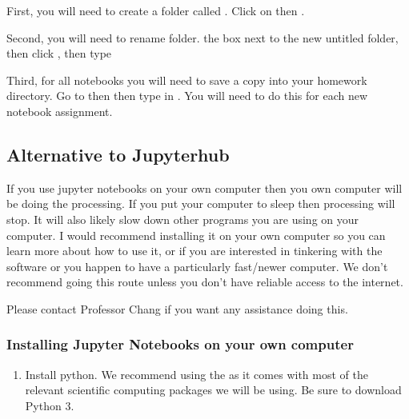 \documentclass[letterpaper,10pt,english]{sphinxmanual}
\begin{document}
First, you will need to create a folder called . Click on  then .

Second, you will need to rename folder.  the box next to the new untitled folder, then click , then type 

Third, for all notebooks you will need to save a copy into your homework directory. Go to  then  then type in . You will need to do this for each new notebook assignment.


\subsection{Alternative to Jupyterhub}
\label{\detokenize{content/Introduction_to_JupyterHub:alternative-to-jupyterhub}}
If you use jupyter notebooks on your own computer then you own computer will be doing the processing. If you put your computer to sleep then processing will stop. It will also likely slow down other programs you are using on your computer. I would recommend installing it on your own computer so you can learn more about how to use it, or if you are interested in tinkering with the software or you happen to have a particularly fast/newer computer. We don’t recommend going this route unless you don’t have reliable access to the internet.

Please contact Professor Chang if you want any assistance doing this.


\subsubsection{Installing Jupyter Notebooks on your own computer}
\label{\detokenize{content/Introduction_to_JupyterHub:installing-jupyter-notebooks-on-your-own-computer}}\begin{enumerate}
%
\item {} 
Install python. We recommend using the  as it comes with most of the relevant scientific computing packages we will be using.  Be sure to download Python 3.

\end{enumerate}
\end{document}
